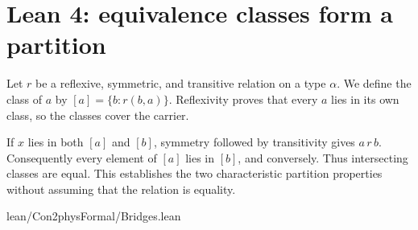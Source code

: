 \section{Lean 4: equivalence classes form a partition}
\label{sec:lean-bridge-05}
Let $r$ be a reflexive, symmetric, and transitive relation on a
type $\alpha$. We define the class of $a$ by
$[a]=\{b:r(b,a)\}$. Reflexivity proves that every $a$ lies
in its own class, so the classes cover the carrier.

If $x$ lies in both $[a]$ and $[b]$, symmetry followed by
transitivity gives $a\,r\,b$. Consequently every element of
$[a]$ lies in $[b]$, and conversely. Thus intersecting
classes are equal. This establishes the two characteristic
partition properties without assuming that the relation is
equality.


{lean/Con2physFormal/Bridges.lean}
